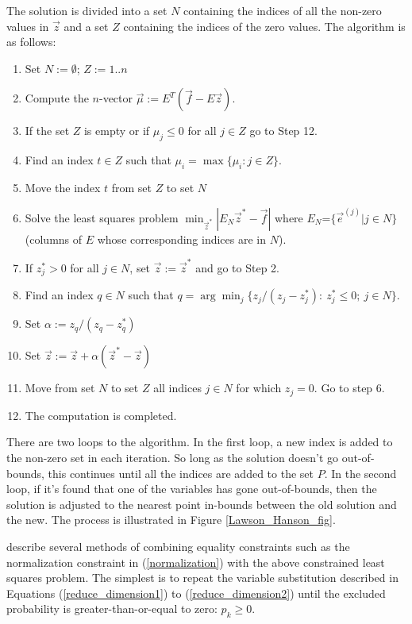The solution is divided into a set $N$ containing the indices of 
all the non-zero values in $\vec z$ and a set $Z$ containing the indices of the 
zero values.
The algorithm is as follows:
\begin{enumerate}
	\item Set $N := \emptyset$; $Z:=1..n$
	\item Compute the $n$-vector $\vec \mu := E^T(\vec f - E \vec z)$.
	\item If the set $Z$ is empty or if $\mu_j \le 0$ for all $j \in Z$ go to Step 12.
	\item Find an index $t \in Z$ such that $\mu_i = \max \lbrace \mu_i: j \in Z \rbrace$.
	\item Move the index $t$ from set $Z$ to set $N$
	\item Solve the least squares problem $\min_{\vec z^*} | E_N \vec z^* - \vec f |$ where $E_N$=$\lbrace \vec e^{(j)} | j \in N \rbrace$ (columns of $E$ whose corresponding indices are in $N$).
	\item If $z_j^* > 0$ for all $j \in N$, set $\vec z:= \vec z^*$ and go to Step 2.
	\item Find an index $q \in N$ such that $q = \arg \min_j \lbrace z_j/(z_j - z_j^*): ~z_j^* \le 0;~ j \in N \rbrace$.
	\item Set $\alpha := z_q/(z_q - z_q^*)$
	\item Set $\vec z := \vec z + \alpha(\vec z^* - \vec z)$
	\item Move from set $N$ to set $Z$ all indices $j \in N$ for which $z_j = 0$. Go to step 6.
	\item The computation is completed.
\end{enumerate}

There are two loops to the algorithm. In the first loop, a new index is added
to the non-zero set in each iteration.
So long as the solution doesn't go out-of-bounds, this continues until all
the indices are added to the set $P$.
In the second loop, if it's found that one of the variables has gone out-of-bounds,
then the solution is adjusted to the nearest point in-bounds between the old solution
and the new.
The process is illustrated in Figure \ref{Lawson_Hanson_fig}.

\citet{Lawson_Hanson1995} describe several methods of combining
equality constraints such as the normalization constraint
in (\ref{normalization}) with the above constrained
least squares problem.
The simplest is to repeat the variable substitution
described in Equations (\ref{reduce_dimension1}) to (\ref{reduce_dimension2}) until the excluded
probability is greater-than-or-equal to zero: $p_k\ge 0$.


